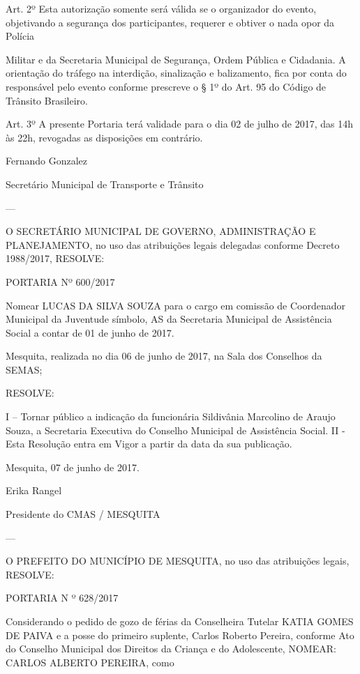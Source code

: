 \documentclass{doliberto}
\begin{document}
Art.  2º  Esta  autorização  somente  será  válida  se  o 
organizador  do  evento,  objetivando  a  segurança  dos 
participantes, requerer e obtiver o nada opor da Polícia 
 

Militar e da Secretaria Municipal de Segurança, Ordem 
Pública  e  Cidadania. 
  A  orientação  do  tráfego  na 
interdição, sinalização e balizamento, fica por conta do 
responsável pelo evento conforme prescreve  o §  1º  do 
Art. 95 do Código de Trânsito Brasileiro.  
 
Art.  3º  A  presente  Portaria  terá  validade  para  o  dia  02  de 
julho de 2017, das 14h às 22h, revogadas as disposições em 
contrário. 
 

Fernando Gonzalez  

Secretário Municipal de Transporte e Trânsito 


---

O  SECRETÁRIO  MUNICIPAL  DE  GOVERNO, 
ADMINISTRAÇÃO E PLANEJAMENTO, no uso das 
atribuições  legais  delegadas  conforme  Decreto 
1988/2017, RESOLVE: 
 
PORTARIA Nº 600/2017 
 
Nomear LUCAS DA SILVA SOUZA para o cargo em 
comissão de Coordenador Municipal da Juventude 
símbolo, AS da Secretaria Municipal de Assistência 
Social a contar de 01 de junho de 2017. 
 

Mesquita, realizada no dia 06 de junho de 2017, na Sala dos 
Conselhos da SEMAS;  
 
RESOLVE: 
 
I  –  Tornar  público  a  indicação  da  funcionária  Sildivânia 
Marcolino  de  Araujo  Souza,  a  Secretaria  Executiva  do 
Conselho Municipal de Assistência Social. 
II  -  Esta  Resolução  entra  em  Vigor  a  partir  da  data  da  sua 
publicação. 

 
Mesquita, 07 de junho de 2017.  

Erika Rangel 

Presidente do CMAS / MESQUITA 

---

O PREFEITO DO MUNICÍPIO DE MESQUITA, no 
uso das atribuições legais,  
RESOLVE:  
 
PORTARIA N º 628/2017 
 
                Considerando  o  pedido  de  gozo  de  férias  da 
Conselheira Tutelar KATIA GOMES DE PAIVA e a posse do 
primeiro suplente, Carlos Roberto Pereira, conforme Ato do 
Conselho  Municipal  dos  Direitos  da  Criança  e  do 
Adolescente, NOMEAR: CARLOS ALBERTO PEREIRA, como 
 
\end{document}
